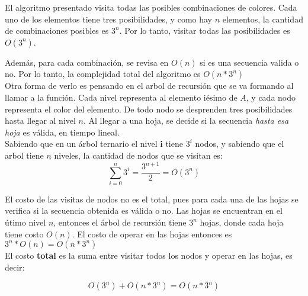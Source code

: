 El algoritmo presentado visita todas las posibles combinaciones de colores. Cada uno de los elementos tiene tres posibilidades, y como hay $n$ elementos, la cantidad de combinaciones posibles es $3^{n}$. Por lo tanto, visitar todas las posibilidades es $O(3^{n})$.

Además, para cada combinación, se revisa en $O(n)$ si es una secuencia valida o no. Por lo tanto, la complejidad total del algoritmo es $O(n * 3^{n})$ \\

Otra forma de verlo es pensando en el arbol de recursión que se va formando al llamar a la función. Cada nivel representa al elemento iésimo de $A$, y cada nodo representa el color del elemento. De todo nodo se desprenden tres posibilidades hasta llegar al nivel $n$. Al llegar a una hoja, se decide si la secuencia \textit{hasta esa hoja} es válida, en tiempo lineal. \\

Sabiendo que en un árbol ternario el nivel \textbf{i} tiene $3^{i}$ nodos, y sabiendo que el arbol tiene $n$ niveles, la cantidad de nodos que se visitan es: \\

$$\sum_{i = 0}^{n} 3^{i} = \frac{3^{n+1}}{2} = O(3^n)$$

El costo de las visitas de nodos no es el total, pues para cada una de las hojas se verifica si la secuencia obtenida es válida o no. Las hojas se encuentran en el útimo nivel $n$, entonces el árbol de recursión tiene $3^n$ hojas, donde cada hoja tiene costo $O(n)$. El costo de operar en las hojas entonces es $3^n * O(n) = O(n * 3^n)$ \\

El costo \textbf{total} es la suma entre visitar todos los nodos y operar en las hojas, es decir:

$$O(3^n) + O(n * 3^n) = O(n * 3^n) $$
